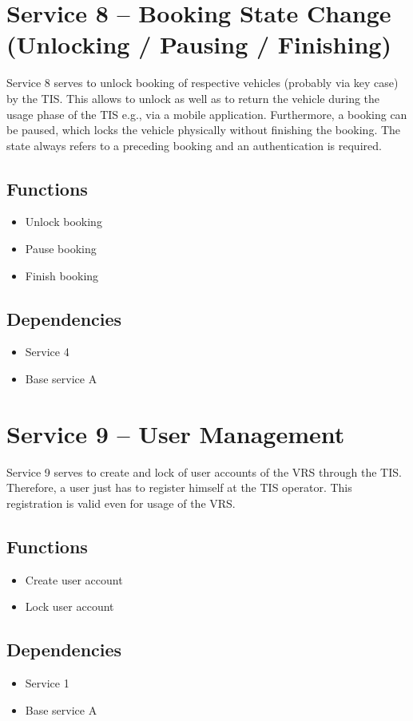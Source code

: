 \section{Service 8 -- Booking State Change (Unlocking / Pausing / Finishing)}
Service 8 serves to unlock booking of respective vehicles (probably via key case) by the TIS. This allows to unlock as well as to return the vehicle during the usage phase of the TIS e.g., via a mobile application. Furthermore, a booking can be paused, which locks the vehicle physically without finishing the booking. 
The state always refers to a preceding booking and an authentication is required.  

\subsection*{Functions}
\begin{itemize}
\item Unlock booking
\item Pause booking 
\item Finish booking 
\end{itemize}

\subsection*{Dependencies}
\begin{itemize}
\item Service 4
\item Base service A
\end{itemize}

\section{Service 9 -- User Management}
Service 9 serves to create and lock of user accounts of the VRS through the TIS. Therefore, a user just has to register himself at the TIS operator. This registration is valid even for usage of the VRS.

\subsection*{Functions}
\begin{itemize}
\item Create user account
\item Lock user account
\end{itemize}

\subsection*{Dependencies}
\begin{itemize}
\item Service 1
\item Base service A
\end{itemize}


